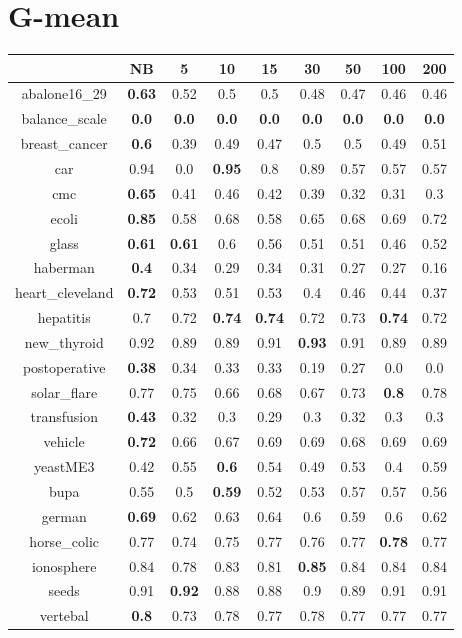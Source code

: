 \documentclass{article}%
\begin{document}
%
\section*{G{-}mean}%
\begin{tabular}{c|cccccccc}%
\hline%
&NB&5&10&15&30&50&100&200\\%
\hline%
abalone16\_29&\textbf{0.63}&0.52&0.5&0.5&0.48&0.47&0.46&0.46\\%
\hline%
balance\_scale&\textbf{0.0}&\textbf{0.0}&\textbf{0.0}&\textbf{0.0}&\textbf{0.0}&\textbf{0.0}&\textbf{0.0}&\textbf{0.0}\\%
\hline%
breast\_cancer&\textbf{0.6}&0.39&0.49&0.47&0.5&0.5&0.49&0.51\\%
\hline%
car&0.94&0.0&\textbf{0.95}&0.8&0.89&0.57&0.57&0.57\\%
\hline%
cmc&\textbf{0.65}&0.41&0.46&0.42&0.39&0.32&0.31&0.3\\%
\hline%
ecoli&\textbf{0.85}&0.58&0.68&0.58&0.65&0.68&0.69&0.72\\%
\hline%
glass&\textbf{0.61}&\textbf{0.61}&0.6&0.56&0.51&0.51&0.46&0.52\\%
\hline%
haberman&\textbf{0.4}&0.34&0.29&0.34&0.31&0.27&0.27&0.16\\%
\hline%
heart\_cleveland&\textbf{0.72}&0.53&0.51&0.53&0.4&0.46&0.44&0.37\\%
\hline%
hepatitis&0.7&0.72&\textbf{0.74}&\textbf{0.74}&0.72&0.73&\textbf{0.74}&0.72\\%
\hline%
new\_thyroid&0.92&0.89&0.89&0.91&\textbf{0.93}&0.91&0.89&0.89\\%
\hline%
postoperative&\textbf{0.38}&0.34&0.33&0.33&0.19&0.27&0.0&0.0\\%
\hline%
solar\_flare&0.77&0.75&0.66&0.68&0.67&0.73&\textbf{0.8}&0.78\\%
\hline%
transfusion&\textbf{0.43}&0.32&0.3&0.29&0.3&0.32&0.3&0.3\\%
\hline%
vehicle&\textbf{0.72}&0.66&0.67&0.69&0.69&0.68&0.69&0.69\\%
\hline%
yeastME3&0.42&0.55&\textbf{0.6}&0.54&0.49&0.53&0.4&0.59\\%
\hline%
bupa&0.55&0.5&\textbf{0.59}&0.52&0.53&0.57&0.57&0.56\\%
\hline%
german&\textbf{0.69}&0.62&0.63&0.64&0.6&0.59&0.6&0.62\\%
\hline%
horse\_colic&0.77&0.74&0.75&0.77&0.76&0.77&\textbf{0.78}&0.77\\%
\hline%
ionosphere&0.84&0.78&0.83&0.81&\textbf{0.85}&0.84&0.84&0.84\\%
\hline%
seeds&0.91&\textbf{0.92}&0.88&0.88&0.9&0.89&0.91&0.91\\%
\hline%
vertebal&\textbf{0.8}&0.73&0.78&0.77&0.78&0.77&0.77&0.77\\%
\hline%
\end{tabular}

%
\end{document}
